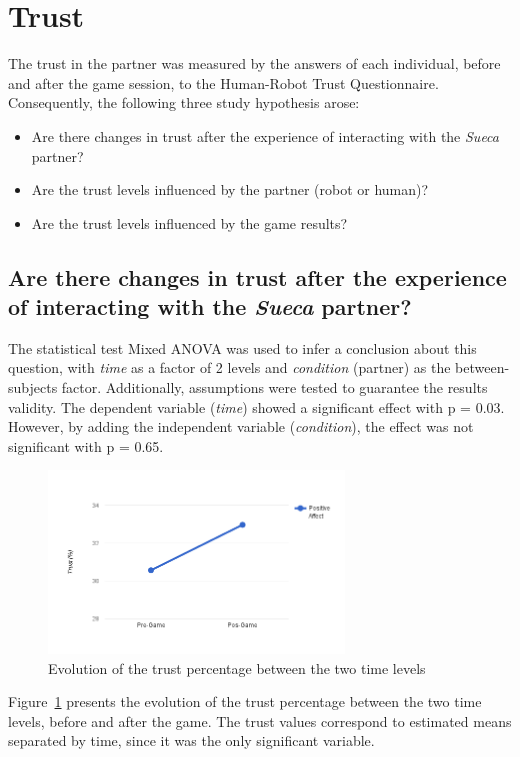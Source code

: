 \section{Trust}
\label{sec:trust}
The trust in the partner was measured by the answers of each individual, before and after the game session, to the Human-Robot Trust Questionnaire.
Consequently, the following three study hypothesis arose:
\begin{itemize}
\item Are there changes in trust after the experience of interacting with the \emph{Sueca} partner?
\item Are the trust levels influenced by the partner (robot or human)?
\item Are the trust levels influenced by the game results?
\end{itemize}


\subsection*{Are there changes in trust after the experience of interacting with the \emph{Sueca} partner?}
The statistical test Mixed ANOVA was used to infer a conclusion about this question, with \emph{time} as a factor of 2 levels and \emph{condition} (partner) as the between-subjects factor.
Additionally, assumptions were tested to guarantee the results validity.
The dependent variable (\emph{time}) showed a significant effect with p = 0.03.
However, by adding the independent variable (\emph{condition}), the effect was not significant with p = 0.65.

\begin{figure}[h!]
  \centering
    \includegraphics[width=0.7\textwidth]{./img/7/trustTime}
  \caption{Evolution of the trust percentage between the two time levels}
\label{fig:trustTime}
\end{figure}

Figure~\ref{fig:trustTime} presents the evolution of the trust percentage between the two time levels, before and after the game.
The trust values correspond to estimated means separated by time, since it was the only significant variable.

